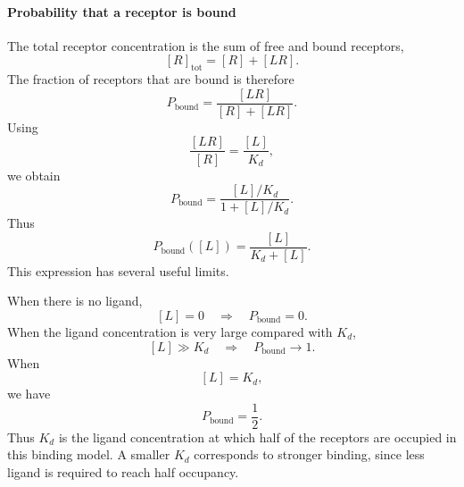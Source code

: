 \paragraph{Probability that a receptor is bound}
The total receptor concentration is the sum of free and bound receptors,
\[
    [R]_{\mathrm{tot}} = [R] + [LR].
\]
The fraction of receptors that are bound is therefore
\[
    P_{\mathrm{bound}} = \frac{[LR]}{[R]+[LR]}.
\]
Using
\[
    \frac{[LR]}{[R]} = \frac{[L]}{K_d},
\]
we obtain
\[
    P_{\mathrm{bound}} = \frac{[L]/K_d}{1+[L]/K_d}.
\]
Thus
\begin{equation}
    \boxed{P_{\mathrm{bound}}([L]) = \frac{[L]}{K_d+[L]}.}
    \label{eq:binding-occupancy}
\end{equation}
This expression has several useful limits.

When there is no ligand,
\[
    [L]=0 \quad \Rightarrow \quad P_{\mathrm{bound}}=0.
\]
When the ligand concentration is very large compared with $K_d$,
\[
    [L]\gg K_d \quad \Rightarrow \quad P_{\mathrm{bound}}\rightarrow1.
\]
When
\[
    [L]=K_d,
\]
we have
\[
    P_{\mathrm{bound}} = \frac{1}{2}.
\]
Thus $K_d$ is the ligand concentration at which half of the receptors are occupied in this binding model.
A smaller $K_d$ corresponds to stronger binding, since less ligand is required to reach half occupancy.
% 
% 
